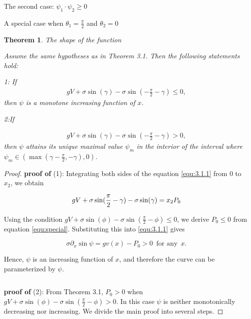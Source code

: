 \documentclass[letterpaper,reqno,10pt,twoside]{amsart}
\newtheorem{theorem}{Theorem}[section]
\theoremstyle{definition}
\theoremstyle{remark}
\begin{document}
\begin{section}{The second case: $\psi_1\cdot \psi_2\geq 0$ }
\begin{subsection}{A special case when $\theta_1=\frac{\pi}{2}$ and $\theta_2=0$}
    \begin{theorem}{The shape of the function }

Assume the same hypotheses as in Theorem 3.1. Then the following statements hold:
    
    1: If
    \begin{align}
        gV+\sigma \sin(\gamma)-\sigma \sin(-\frac{\pi}{2}-\gamma)\leq 0, 
    \end{align}
     then $\psi$ is a monotone increasing function of $x$.

    2:If

    \begin{align}
        gV+\sigma \sin(\gamma)-\sigma \sin(-\frac{\pi}{2}-\gamma)>0,
    \end{align}
      then $\psi$ attains its unique maximal value $\psi_m$ in the interior of the interval where $ \psi_m\in(\max(\gamma-\frac{\pi}{2},-\gamma),0)$. 
    \end{theorem}

    \begin{proof}

    \textbf{proof of} (1):  Integrating both sides of the equation \eqref{equ:3.1.1} from 0 to $x_2$, we obtain

    \begin{equation}{\label{equ:special}}
        gV+\sigma \sin(\frac{\pi}{2}-\gamma)-\sigma\sin(\gamma)=x_2P_{0}
    \end{equation}

    \noindent Using the condition $gV+\sigma \sin(\phi)-\sigma \sin(\frac{\pi}{2}-\phi)\leq 0$, we derive $P_{0}\leq 0$ from equation \eqref{equ:special}. Substituting this into \eqref{equ:3.1.1} gives
    
    \begin{equation*}
        \sigma \partial_{x} \sin\psi=gv(x)-P_{0}>0~\operatorname{for~any}~x.
    \end{equation*}

    \noindent Hence, $\psi$ is an increasing function of $x$, and therefore the curve can be parameterized by $\psi$.

    \begin{equation*}
        ~
    \end{equation*}
    
    \textbf{proof of} (2): From Theorem 3.1, $P_{0}> 0$ when  $gV+\sigma \sin(\phi)-\sigma \sin(\frac{\pi}{2}-\phi)>0$. In this case $\psi$ is neither monotonically decreasing nor increasing. We divide the main proof into several steps.


\end{proof}
\end{subsection}
\end{section}
\end{document}
